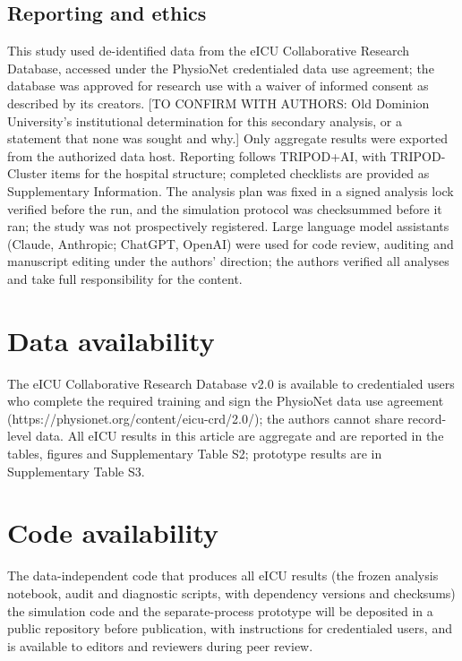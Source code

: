 \documentclass[11pt]{article}
\begin{document}
\subsection*{Reporting and ethics}
This study used de-identified data from the eICU Collaborative Research Database, accessed under the PhysioNet credentialed data use agreement\cite{r1}; the database was approved for research use with a waiver of informed consent as described by its creators\cite{r2}. [TO CONFIRM WITH AUTHORS: Old Dominion University's institutional determination for this secondary analysis, or a statement that none was sought and why.] Only aggregate results were exported from the authorized data host. Reporting follows TRIPOD+AI, with TRIPOD-Cluster items for the hospital structure\cite{r9,r19}; completed checklists are provided as Supplementary Information. The analysis plan was fixed in a signed analysis lock verified before the run, and the simulation protocol was checksummed before it ran; the study was not prospectively registered. Large language model assistants (Claude, Anthropic; ChatGPT, OpenAI) were used for code review, auditing and manuscript editing under the authors' direction; the authors verified all analyses and take full responsibility for the content.

\section*{Data availability}
The eICU Collaborative Research Database v2.0 is available to credentialed users who complete the required training and sign the PhysioNet data use agreement (https://physionet.org/content/eicu-crd/2.0/); the authors cannot share record-level data. All eICU results in this article are aggregate and are reported in the tables, figures and Supplementary Table S2; prototype results are in Supplementary Table S3.

\section*{Code availability}
The data-independent code that produces all eICU results (the frozen analysis notebook, audit and diagnostic scripts, with dependency versions and checksums) the simulation code and the separate-process prototype will be deposited in a public repository before publication, with instructions for credentialed users, and is available to editors and reviewers during peer review.
\end{document}
